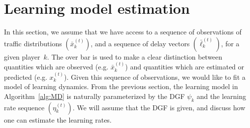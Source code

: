 \documentclass{sig-alternate-ipsn13}
\begin{document}

\section{Learning model estimation}
\label{sec:estimation}
In this section, we assume that we have access to a sequence of observations of traffic distributions $(\bar x^{(t)}_k)$, and a sequence of delay vectors $(\bar \ell^{(t)}_k)$, for a given player~$k$. The over bar is used to make a clear distinction between quantities which are observed (e.g. $\bar x^{(t)}_k$) and quantities which are estimated or predicted (e.g. $x^{(t)}_k$). Given this sequence of observations, we would like to fit a model of learning dynamics. From the previous section, the learning model in Algorithm~\ref{alg:MD} is naturally parameterized by the DGF $\psi_k$ and the learning rate sequence $(\eta_k^{(t)})$. We will assume that the DGF is given, and discuss how one can estimate the learning rates.

\end{document}
